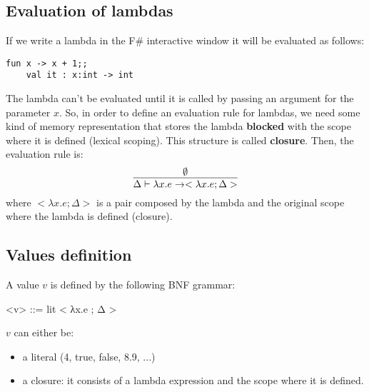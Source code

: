 \subsection{Evaluation of lambdas}
If we write a lambda in the F\# interactive window it will be evaluated as follows:
\begin{lstlisting}[style=FSharpStyle]
    fun x -> x + 1;;
    val it : x:int -> int
\end{lstlisting}
The lambda can't be evaluated until it is called by passing an argument for the parameter $x$. So, in order to define an evaluation rule for lambdas, we need some kind of memory representation that stores the lambda \textbf{blocked} with the scope where it is defined (lexical scoping). This structure is called \textbf{closure}. Then, the evaluation rule is:
\[
\infer{\Delta \vdash \lambda x.e \rightarrow <\lambda x.e;\Delta>}{\emptyset}\]
where $<\lambda x.e;\Delta>$ is a pair composed by the lambda and the original scope where the lambda is defined (closure).
\subsection{Values definition}
A value $v$ is defined by the following BNF grammar:
\begin{grammar}
    <v> ::= lit
    \alt < λx.e ; Δ >
\end{grammar}
$v$ can either be:
\begin{itemize}
    \item a literal (4, true, false, 8.9, ...)
    \item a closure: it consists of a lambda expression and the scope where it is defined.
\end{itemize}

